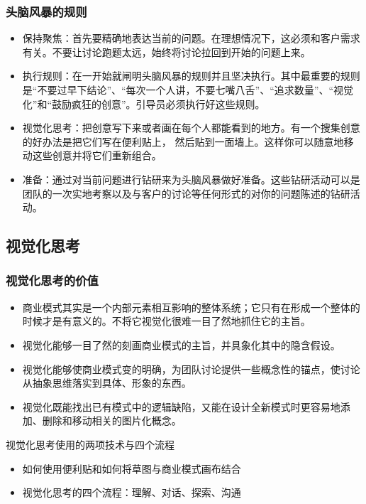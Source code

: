 \subsubsection{头脑风暴的规则}

\begin{itemize}
    \item 保持聚焦：首先要精确地表达当前的问题。在理想情况下，这必须和客户需求有关。不要让讨论跑题太远，始终将讨论拉回到开始的问题上来。
    \item 执行规则：在一开始就闸明头脑风暴的规则并且坚决执行。其中最重要的规则是“不要过早下结论”、“每次一个人讲，不要七嘴八舌”、“追求数量”、“视觉化”和“鼓励疯狂的创意”。引导员必须执行好这些规则。
    \item 视觉化思考：把创意写下来或者画在每个人都能看到的地方。有一个搜集创意的好办法是把它们写在便利贴上， 然后贴到一面墙上。这样你可以随意地移动这些创意并将它们重新组合。
    \item 准备：通过对当前问题进行钻研来为头脑风暴做好准备。这些钻研活动可以是团队的一次实地考察以及与客户的讨论等任何形式的对你的问题陈述的钻研活动。
\end{itemize}


\subsection{视觉化思考}

\subsubsection{视觉化思考的价值}

\begin{itemize}
    \item 商业模式其实是一个内部元素相互影响的整体系统；它只有在形成一个整体的时候才是有意义的。不将它视觉化很难一目了然地抓住它的主旨。
    \item 视觉化能够一目了然的刻画商业模式的主旨，并具象化其中的隐含假设。
    \item 视觉化能够使商业模式变的明确，为团队讨论提供一些概念性的锚点，使讨论从抽象思维落实到具体、形象的东西。
    \item  视觉化既能找出已有模式中的逻辑缺陷，又能在设计全新模式时更容易地添加、删除和移动相关的图片化概念。
\end{itemize}

视觉化思考使用的两项技术与四个流程
\begin{itemize}
    \item 如何使用便利贴和如何将草图与商业模式画布结合
    \item 视觉化思考的四个流程：理解、对话、探索、沟通
\end{itemize}

